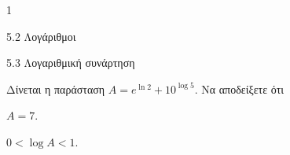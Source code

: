 \begin{ylh}{1}
\item 5.2 Λογάριθμοι
\item 5.3 Λογαριθμική συνάρτηση
\end{ylh}
Δίνεται η παράσταση $A = e^{\ln 2} + 10^{\log 5}$. Να αποδείξετε ότι
\begin{alist}
\item $A = 7$.
\item $0 < \log A < 1$.
\end{alist}

